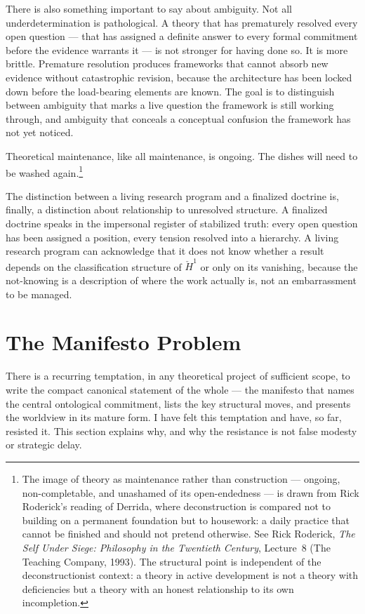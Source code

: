 \documentclass[12pt, a4paper]{article}
\begin{document}
There is also something important to say about ambiguity. Not all underdetermination is pathological. A theory that has prematurely resolved every open question --- that has assigned a definite answer to every formal commitment before the evidence warrants it --- is not stronger for having done so. It is more brittle. Premature resolution produces frameworks that cannot absorb new evidence without catastrophic revision, because the architecture has been locked down before the load-bearing elements are known. The goal is to distinguish between ambiguity that marks a live question the framework is still working through, and ambiguity that conceals a conceptual confusion the framework has not yet noticed.

Theoretical maintenance, like all maintenance, is ongoing. The dishes will need to be washed again.\footnote{The image of theory as maintenance rather than construction --- ongoing, non-completable, and unashamed of its open-endedness --- is drawn from Rick Roderick's reading of Derrida, where deconstruction is compared not to building on a permanent foundation but to housework: a daily practice that cannot be finished and should not pretend otherwise. See Rick Roderick, \textit{The Self Under Siege: Philosophy in the Twentieth Century}, Lecture~8 (The Teaching Company, 1993). The structural point is independent of the deconstructionist context: a theory in active development is not a theory with deficiencies but a theory with an honest relationship to its own incompletion.}

The distinction between a living research program and a finalized doctrine is, finally, a distinction about relationship to unresolved structure. A finalized doctrine speaks in the impersonal register of stabilized truth: every open question has been assigned a position, every tension resolved into a hierarchy. A living research program can acknowledge that it does not know whether a result depends on the classification structure of $\check{H}^1$ or only on its vanishing, because the not-knowing is a description of where the work actually is, not an embarrassment to be managed.

\section{The Manifesto Problem}

There is a recurring temptation, in any theoretical project of sufficient scope, to write the compact canonical statement of the whole --- the manifesto that names the central ontological commitment, lists the key structural moves, and presents the worldview in its mature form. I have felt this temptation and have, so far, resisted it. This section explains why, and why the resistance is not false modesty or strategic delay.
\end{document}
